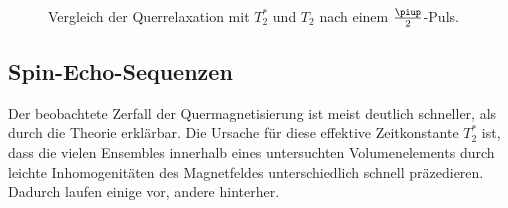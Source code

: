 \documentclass[
    11pt,
    ngerman
]{scrbook}
\begin{document}
\begin{figure}[htbp]
    \begin{minipage}[htbp]{.45\textwidth}
        \centering
        \caption{%
            Sättigungsrückgewinnung nach einem $\frac\piup2$-Puls.
    }
\end{minipage}
\hfill
\begin{minipage}[htbp]{.45\textwidth}
    \centering
    \caption{%
        Vergleich der Querrelaxation mit $T_2^*$ und $T_2$ nach einem $\frac\piup2$-Puls. 
    }
\end{minipage}
\end{figure}


\subsection{Spin-Echo-Sequenzen}

Der beobachtete Zerfall der Quermagnetisierung ist meist deutlich schneller,
als durch die Theorie erklärbar. Die Ursache für diese effektive Zeitkonstante
$T_2^*$ ist, dass die vielen Ensembles innerhalb eines untersuchten
Volumenelements durch leichte Inhomogenitäten des Magnetfeldes unterschiedlich
schnell präzedieren. Dadurch laufen einige vor, andere hinterher.
\end{document}
